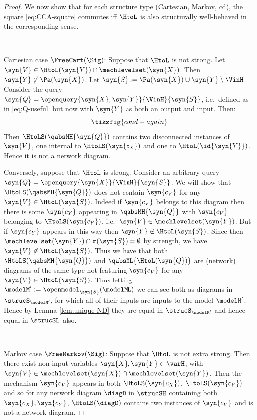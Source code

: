 \documentclass{article}
\begin{document}
{\begin{proof}
We now show that for each structure type (Cartesian, Markov, cd), the square \eqref{eq:CCA-square} commutes iff $\HtoL$ is also structurally well-behaved in the corresponding sense. 

\ \ 

\underline{Cartesian case $\FreeCart(\Sig)$:} Suppose that $\HtoL$ is not strong. Let $\syn{V} \in \HtoL(\syn{Y}) \cap  \mechlevelset(\syn{X})$. Then $\syn{Y} \not \in \Pa(\syn{X})$. Let $\syn{S} :=  \Pa(\syn{X}) \cup \syn{Y} \setminus \VinH$. Consider the query $\syn{Q} = \openquery{\syn{X},\syn{Y}}{\VinH}{\syn{S}}$, i.e.~defined as in \eqref{eq:Q-useful} but now with $\syn{Y}$ as both an output and input. Then: 
\[
\tikzfig{cond-again}
\]
 Then $\HtoLS(\qabsMH{\syn{Q}})$ contains two disconnected instances of $\syn{V}$, one internal to $\HtoLS(\syn{c_X})$ and one to $\HtoL(\id{\syn{Y}})$. Hence it is not a network diagram.

Conversely, suppose that $\HtoL$ is strong. Consider an arbitrary query $\syn{Q} = \openquery{\syn{X}}{\VinH}{\syn{S}}$. We will show that $\HtoLS(\qabsMH{\syn{Q}})$ does not contain $\syn{c_V}$ for any $\syn{V} \in \HtoL(\syn{S})$. Indeed if $\syn{c_V}$ belongs to this diagram then there is some $\syn{c_Y}$ appearing in $\qabsMH{\syn{Q}}$ with $\syn{c_V}$ belonging to $\HtoLS(\syn{c_Y})$, i.e.~$\syn{V} \in \mechlevelset(\syn{Y})$. But if $\syn{c_Y}$ appears in this way then $\syn{Y} \not \in \HtoL(\syn{S})$. Since then $\mechlevelset(\syn{Y}) \cap \pi(\syn{S}) = \emptyset$ by strength, we have $\syn{V} \not \in \HtoL(\syn{S})$. Thus we have that both $\HtoLS(\qabsMH{\syn{Q}})$ and $\qabsML{\HtoL(\syn{Q})}$ are (network) diagrams of the same type not featuring $\syn{c_V}$ for any $\syn{V} \in \HtoL(\syn{S})$. Thus letting $\modelM' := \openmodel_\syn{S}(\modelML)$ we can see both as diagrams in $\strucS_{\modelM'}$, for which all of their inputs are inputs to the model $\modelM'$. Hence by Lemma \ref{lem:unique-ND} they are equal in $\strucS_{\modelM'}$ and hence equal in $\strucSL$ also. 

\ \ 

\underline{Markov case $\FreeMarkov(\Sig)$:} Suppose that $\HtoL$ is not extra strong. Then there exist non-input variables $\syn{X},\syn{Y} \in \varH$, with $\syn{V} \in \mechlevelset(\syn{X}) \cap \mechlevelset(\syn{Y})$. Then the mechanism $\syn{c_V}$ appears in both $\HtoLS(\syn{c_X})$, $\HtoLS(\syn{c_Y})$ and so for any network diagram $\diagD$ in $\strucSH$ containing both $\syn{c_X},\syn{c_Y}$, $\HtoLS(\diagD)$ contains two instances of $\syn{c_V}$ and is not a network diagram. 


\end{proof}}
\end{document}
